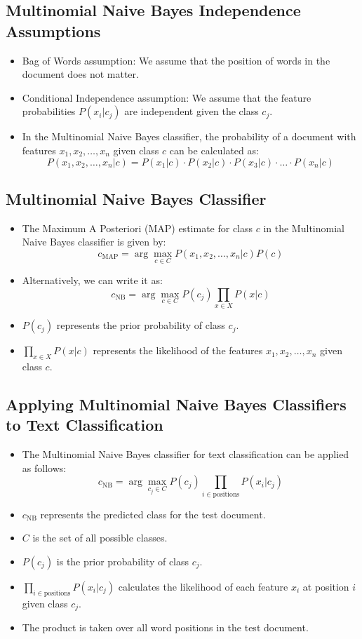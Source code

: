 \documentclass{book}
\begin{document}
\subsection{Multinomial Naive Bayes Independence Assumptions}

\begin{itemize}
    \item Bag of Words assumption: We assume that the position of words in the document does not matter.
    \item Conditional Independence assumption: We assume that the feature probabilities $P(x_i | c_j)$ are independent given the class $c_j$.
    \item In the Multinomial Naive Bayes classifier, the probability of a document with features $x_1, x_2, \ldots, x_n$ given class $c$ can be calculated as:
    \[
    P(x_1, x_2, \ldots, x_n | c) = P(x_1 | c) \cdot P(x_2 | c) \cdot P(x_3 | c) \cdot \ldots \cdot P(x_n | c)
    \]
\end{itemize}

\subsection{Multinomial Naive Bayes Classifier}
\begin{itemize}
    \item The Maximum A Posteriori (MAP) estimate for class $c$ in the Multinomial Naive Bayes classifier is given by:
    \[
    c_{\text{MAP}} = \arg\max_{c \in C} P(x_1, x_2, \ldots, x_n | c)P(c)
    \]
    \item Alternatively, we can write it as:
    \[
    c_{\text{NB}} = \arg\max_{c \in C} P(c_j) \prod_{x \in X} P(x | c)
    \]
    \item $P(c_j)$ represents the prior probability of class $c_j$.
    \item $\prod_{x \in X} P(x | c)$ represents the likelihood of the features $x_1, x_2, \ldots, x_n$ given class $c$.
\end{itemize}


\subsection{Applying Multinomial Naive Bayes Classifiers to Text Classification}
\begin{itemize}
    \item The Multinomial Naive Bayes classifier for text classification can be applied as follows:
    \[
    c_{\text{NB}} = \arg\max_{c_j \in C} P(c_j) \prod_{i \in \text{positions}} P(x_i | c_j)
    \]
    \item $c_{\text{NB}}$ represents the predicted class for the test document.
    \item $C$ is the set of all possible classes.
    \item $P(c_j)$ is the prior probability of class $c_j$.
    \item $\prod_{i \in \text{positions}} P(x_i | c_j)$ calculates the likelihood of each feature $x_i$ at position $i$ given class $c_j$.
    \item The product is taken over all word positions in the test document.
\end{itemize}
\end{document}

